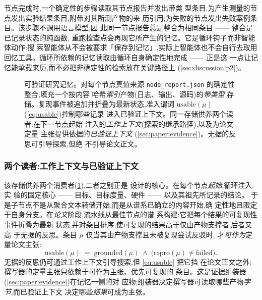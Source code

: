 节点完成时,一个确定性的步骤读取其节点报告并发出带类
型条目:为产生测量的节点发出实验结果条目,附带对其所测产物的来
历引用;为失败的节点发出失败案例条目。该步骤不调用语言模型,因
此同一节点报告总是整合为相同条目 —— 整合是已记录状态的纯函数,
重跑检查点会再现它所产生的记忆。它是循环钩子而非智能体动作:搜
索智能体从不会被要求「保存到记忆」,实际上智能体也不会自行去取用
回忆工具。循环所依赖的记忆读取由循环自身确定性地完成 —— 正是这
一点让记忆能承载来历,而不必把非确定性的检索放在关键路径上
(\cref{sec:discussion:p2})。

\begin{figure}[t]
  \centering
  \resizebox{0.92\columnwidth}{!}{}
  \caption{可验证研究记忆。对每个节点真值来源
           \texttt{node\_report.json} 的确定性整合,填充一个按内容
           哈希\emph{索引}产物(日志、输出、源码)的\emph{带类型}
           存储。复现事件被追加并折叠为最新状态,准入谓词
           $\mathrm{usable}(\mu)$(\cref{eq:usable})控制哪些记录
           进入已验证上下文。同一存储供养两个读者:在下一节点起始
           注入的\emph{工作上下文}(探索的继承路径),以及为论文定量
           主张提供依据的\emph{已验证上下文}
           (\cref{sec:paper:evidence})。无据的反思可引导探索,但绝
           不引导论文正文。}
  \label{fig:research-memory}
\end{figure}

\subsubsection*{两个读者:工作上下文与已验证上下文}

该存储供养两个消费者(\cref{fig:research-memory}),二者之别正是
设计的核心。在每个节点\emph{起始},循环注入:实
验的固定核心 —— 目标、目标度量、硬件 —— 以及其祖先所记录的结论。
于是子节点不是从聚合文本转储开始,而是从谱系已确立的内容开始,确
定性地且限定于自身分支。在\emph{论文}阶段,流水线从最佳节点的谱
系构建:它把每个结果的可复现性事件折叠为最新
状态,并对条目排序,使可复现的结果高于仅由产物支撑者,后者又高
于无据的反思。条目 $\mu$ 仅当其由产物支撑且未被复现尝试反驳时,
才\emph{可作为}定量论文主张:
\begin{equation}\label{eq:usable}
  \mathrm{usable}(\mu) \;=\;
    \mathrm{grounded}(\mu)\;\wedge\;
    \bigl(\mathrm{repro}(\mu)\neq\mathrm{failed}\bigr).
\end{equation}
无据的反思仍可通过工作上下文引导搜索,但 \cref{eq:usable} 把它挡
在论文正文之外:撰写器的定量主张只依赖于可作为主张、优先可复现的
条目。这是证据组装器(\cref{sec:paper:evidence})在记忆一侧的对
应物;组装器决定撰写器可读取哪些产物\emph{字节},而已验证上下文
决定哪些\emph{结果}可成为主张。

